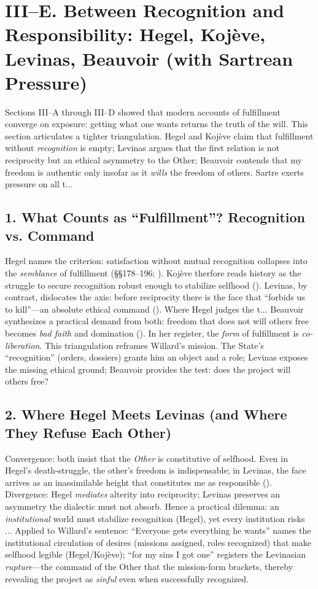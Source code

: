 \section*{III--E. Between Recognition and Responsibility: Hegel, Koj{\`e}ve, Levinas, Beauvoir (with Sartrean Pressure)}

Sections III--A through III--D showed that modern accounts of fulfillment converge on exposure: getting what one wants returns the truth of the will. This section articulates a tighter triangulation. Hegel and Koj{\`e}ve claim that fulfillment without \emph{recognition} is empty; Levinas argues that the first relation is not reciprocity but an ethical asymmetry to the Other; Beauvoir contends that my freedom is authentic only insofar as it \emph{wills} the freedom of others. Sartre exerts pressure on all t...
\subsection*{1. What Counts as ``Fulfillment''? Recognition vs. Command}
Hegel names the criterion: satisfaction without mutual recognition collapses into the \emph{semblance} of fulfillment (\S\S 178--196; \parencite{HegelPhenomenology1977}). Koj{\`e}ve therfore reads history as the struggle to secure recognition robust enough to stabilize selfhood (\parencite{KojeveIRH1980}). Levinas, by contrast, dislocates the axis: before reciprocity there is the face that ``forbids us to kill''---an absolute ethical command (\parencite[p.~199]{LevinasTI1969}). Where Hegel judges the t...
Beauvoir synthesizes a practical demand from both: freedom that does not will others free becomes \emph{bad faith} and domination (\parencite[p.~73]{Beauvoir1976}). In her register, the \emph{form} of fulfillment is \emph{co-liberation}. This triangulation reframes Willard’s mission. The State’s ``recognition'' (orders, dossiers) grants him an object and a role; Levinas exposes the missing ethical ground; Beauvoir provides the test: does the project will others free?

\subsection*{2. Where Hegel Meets Levinas (and Where They Refuse Each Other)}
Convergence: both insist that the \emph{Other} is constitutive of selfhood. Even in Hegel’s death-struggle, the other’s freedom is indispensable; in Levinas, the face arrives as an inassimilable height that constitutes me as responsible (\parencite{LevinasTI1969}). Divergence: Hegel \emph{mediates} alterity into reciprocity; Levinas preserves an asymmetry the dialectic must not absorb. Hence a practical dilemma: an \emph{institutional} world must stabilize recognition (Hegel), yet every institution risks ...
Applied to Willard’s sentence: ``Everyone gets everything he wants'' names the institutional circulation of desires (missions assigned, roles recognized) that make selfhood legible (Hegel/Koj{\`e}ve); ``for my sins I got one'' registers the Levinasian \emph{rupture}---the command of the Other that the mission-form brackets, thereby revealing the project as \emph{sinful} even when successfully recognized.

